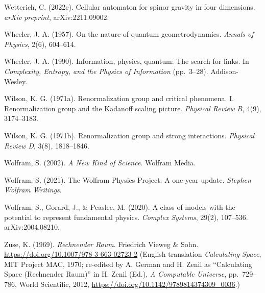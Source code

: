 \documentclass[
]{article}
\begin{document}
Wetterich, C. (2022c). Cellular automaton for spinor gravity in four
dimensions. \emph{arXiv preprint}, arXiv:2211.09002.

Wheeler, J. A. (1957). On the nature of quantum geometrodynamics.
\emph{Annals of Physics}, 2(6), 604--614.

Wheeler, J. A. (1990). Information, physics, quantum: The search for
links. In \emph{Complexity, Entropy, and the Physics of Information}
(pp.~3--28). Addison-Wesley.

Wilson, K. G. (1971a). Renormalization group and critical phenomena. I.
Renormalization group and the Kadanoff scaling picture. \emph{Physical
Review B}, 4(9), 3174--3183.

Wilson, K. G. (1971b). Renormalization group and strong interactions.
\emph{Physical Review D}, 3(8), 1818--1846.

Wolfram, S. (2002). \emph{A New Kind of Science}. Wolfram Media.

Wolfram, S. (2021). The Wolfram Physics Project: A one-year update.
\emph{Stephen Wolfram Writings}.

Wolfram, S., Gorard, J., \& Peaslee, M. (2020). A class of models with
the potential to represent fundamental physics. \emph{Complex Systems},
29(2), 107--536. arXiv:2004.08210.

Zuse, K. (1969). \emph{Rechnender Raum}. Friedrich Vieweg \& Sohn.
\url{https://doi.org/10.1007/978-3-663-02723-2} (English translation
\emph{Calculating Space}, MIT Project MAC, 1970; re-edited by A. German
and H. Zenil as ``Calculating Space (Rechnender Raum)'' in H. Zenil
(Ed.), \emph{A Computable Universe}, pp.~729--786, World Scientific,
2012, \url{https://doi.org/10.1142/9789814374309_0036}.)
\end{document}
